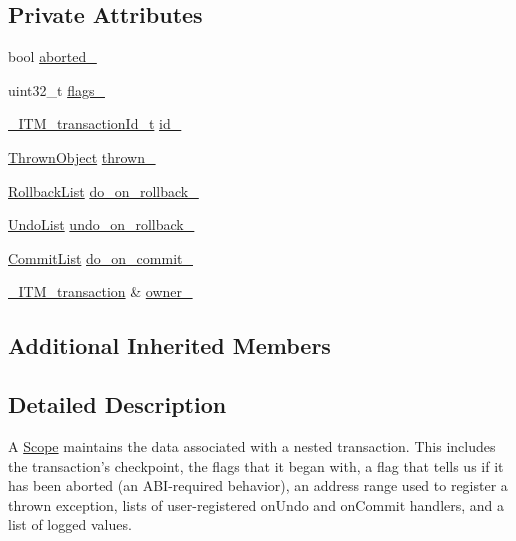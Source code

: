\subsection*{Private Attributes}
\begin{DoxyCompactItemize}
\item 
bool \hyperlink{classitm2stm_1_1Scope_aca000eb926a24898bd118d93e1a8171d}{aborted\-\_\-}
\item 
uint32\-\_\-t \hyperlink{classitm2stm_1_1Scope_a68dec682e6641327b42bfdd99018e1cb}{flags\-\_\-}
\item 
\hyperlink{libitm_8h_a560abc8cf0e1499368b0cc014ee8bd60}{\-\_\-\-I\-T\-M\-\_\-transaction\-Id\-\_\-t} \hyperlink{classitm2stm_1_1Scope_a54acb98c029fcf6167f5fe38f6f66f61}{id\-\_\-}
\item 
\hyperlink{structitm2stm_1_1Scope_1_1ThrownObject}{Thrown\-Object} \hyperlink{classitm2stm_1_1Scope_aa151fee486e7441ea64049ce8f3e0cd0}{thrown\-\_\-}
\item 
\hyperlink{classitm2stm_1_1Scope_af1a9d57c58c4dddb4f5d95f769e749d9}{Rollback\-List} \hyperlink{classitm2stm_1_1Scope_afe42acedeb03836068606c006c4e792f}{do\-\_\-on\-\_\-rollback\-\_\-}
\item 
\hyperlink{classitm2stm_1_1Scope_ab1ab8ebc4445367bfdccc48aa487cfab}{Undo\-List} \hyperlink{classitm2stm_1_1Scope_a866d461e70348a0db9b46627ec81bf8e}{undo\-\_\-on\-\_\-rollback\-\_\-}
\item 
\hyperlink{classitm2stm_1_1Scope_ae7aad983e4d918844dae194d2eb98421}{Commit\-List} \hyperlink{classitm2stm_1_1Scope_a0fe1c2471d6885006110a6d2f48f93d0}{do\-\_\-on\-\_\-commit\-\_\-}
\item 
\hyperlink{libitm_8h_a65d3a93d285fdbde408558d6b431abc8}{\-\_\-\-I\-T\-M\-\_\-transaction} \& \hyperlink{classitm2stm_1_1Scope_abbfd6d926da8e64737daa37efccb43bf}{owner\-\_\-}
\end{DoxyCompactItemize}
\subsection*{Additional Inherited Members}


\subsection{Detailed Description}
A \hyperlink{classitm2stm_1_1Scope}{Scope} maintains the data associated with a nested transaction. This includes the transaction's checkpoint, the flags that it began with, a flag that tells us if it has been aborted (an A\-B\-I-\/required behavior), an address range used to register a thrown exception, lists of user-\/registered on\-Undo and on\-Commit handlers, and a list of logged values.


